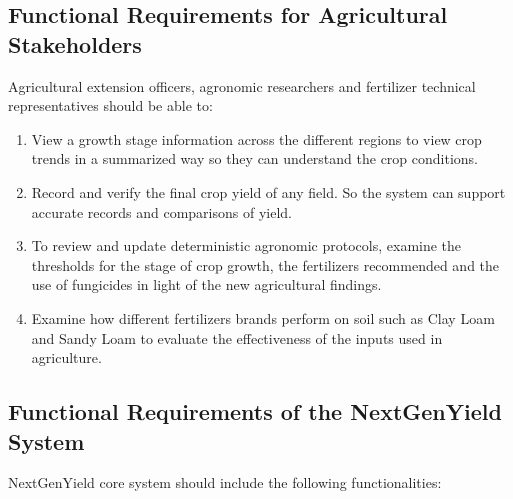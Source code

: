 \documentclass{FastFyp}
\begin{document}
 

\subsection{Functional Requirements for Agricultural Stakeholders}
Agricultural extension officers, agronomic researchers and fertilizer technical representatives should be able to:

\begin{enumerate}
    \item  View a growth stage information across the different regions to view crop trends  in a summarized way so they can understand the crop conditions.

    \item  Record and verify the final crop yield of any field. So the system can support accurate records and comparisons of yield.

    \item To review and update  deterministic agronomic protocols, examine the  thresholds for the stage of crop growth, the fertilizers recommended and the use of fungicides in light of the new agricultural findings.

    \item Examine how different fertilizers brands perform on soil such as Clay Loam and Sandy Loam to evaluate the effectiveness of the inputs used in agriculture.
\end{enumerate}

 

\subsection{Functional Requirements of the NextGenYield System}

NextGenYield core system should include the following functionalities:
\end{document}
